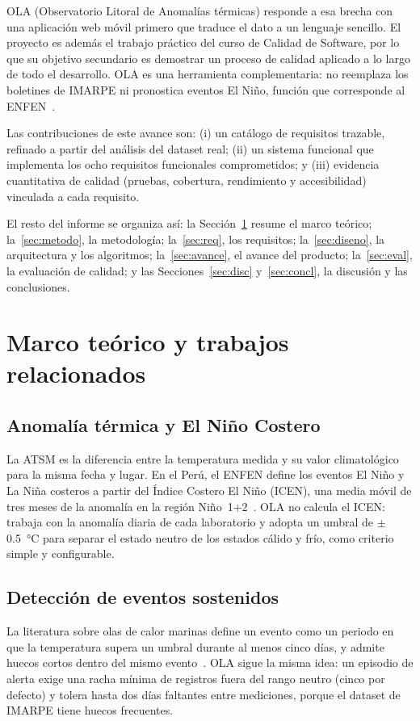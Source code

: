 \documentclass[conference,a4paper]{IEEEtran}
\begin{document}
OLA (Observatorio Litoral de Anomalías térmicas) responde a esa brecha con una aplicación web móvil primero que traduce el dato a un lenguaje sencillo. El proyecto es además el trabajo práctico del curso de Calidad de Software, por lo que su objetivo secundario es demostrar un proceso de calidad aplicado a lo largo de todo el desarrollo. OLA es una herramienta complementaria: no reemplaza los boletines de IMARPE ni pronostica eventos El Niño, función que corresponde al ENFEN~\cite{enfen2024}.

Las contribuciones de este avance son: (i) un catálogo de requisitos trazable, refinado a partir del análisis del dataset real; (ii) un sistema funcional que implementa los ocho requisitos funcionales comprometidos; y (iii) evidencia cuantitativa de calidad (pruebas, cobertura, rendimiento y accesibilidad) vinculada a cada requisito.

El resto del informe se organiza así: la Sección~\ref{sec:marco} resume el marco teórico; la~\ref{sec:metodo}, la metodología; la~\ref{sec:req}, los requisitos; la~\ref{sec:diseno}, la arquitectura y los algoritmos; la~\ref{sec:avance}, el avance del producto; la~\ref{sec:eval}, la evaluación de calidad; y las Secciones~\ref{sec:disc} y~\ref{sec:concl}, la discusión y las conclusiones.

\section{Marco teórico y trabajos relacionados}\label{sec:marco}

\subsection{Anomalía térmica y El Niño Costero}
La ATSM es la diferencia entre la temperatura medida y su valor climatológico para la misma fecha y lugar. En el Perú, el ENFEN define los eventos El Niño y La Niña costeros a partir del Índice Costero El Niño (ICEN), una media móvil de tres meses de la anomalía en la región Niño~1+2~\cite{reupo2024,enfen2024}. OLA no calcula el ICEN: trabaja con la anomalía diaria de cada laboratorio y adopta un umbral de $\pm$\SI{0.5}{\celsius} para separar el estado neutro de los estados cálido y frío, como criterio simple y configurable.

\subsection{Detección de eventos sostenidos}
La literatura sobre olas de calor marinas define un evento como un periodo en que la temperatura supera un umbral durante al menos cinco días, y admite huecos cortos dentro del mismo evento~\cite{capotondi2024}. OLA sigue la misma idea: un episodio de alerta exige una racha mínima de registros fuera del rango neutro (cinco por defecto) y tolera hasta dos días faltantes entre mediciones, porque el dataset de IMARPE tiene huecos frecuentes.
\end{document}
